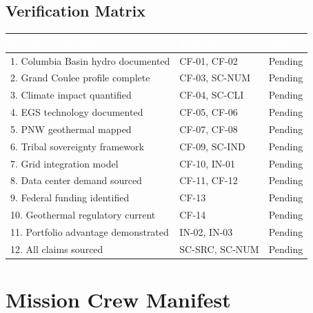 \documentclass[11pt,letterpaper]{article}
\newcommand{\tableheader}[1]{\textbf{\sffamily\textcolor{white}{#1}}}
\begin{document}
\subsection{Verification Matrix}

\begin{center}
\begin{tabularx}{\textwidth}{XL{3.5cm}C{1.5cm}}
\toprule
{}
\tableheader{Success Criterion} & \tableheader{Test ID(s)} & \tableheader{Status} \\
. Columbia Basin hydro documented & CF-01, CF-02 & Pending \\
2. Grand Coulee profile complete & CF-03, SC-NUM & Pending \\
3. Climate impact quantified & CF-04, SC-CLI & Pending \\
4. EGS technology documented & CF-05, CF-06 & Pending \\
5. PNW geothermal mapped & CF-07, CF-08 & Pending \\
6. Tribal sovereignty framework & CF-09, SC-IND & Pending \\
7. Grid integration model & CF-10, IN-01 & Pending \\
8. Data center demand sourced & CF-11, CF-12 & Pending \\
9. Federal funding identified & CF-13 & Pending \\
10. Geothermal regulatory current & CF-14 & Pending \\
11. Portfolio advantage demonstrated & IN-02, IN-03 & Pending \\
12. All claims sourced & SC-SRC, SC-NUM & Pending \\
\bottomrule
\end{tabularx}
\end{center}

\section{Mission Crew Manifest}
\end{document}
